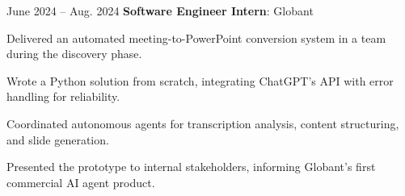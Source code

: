 \vspace{0.18cm}
\begin{twocolentry}{
    June 2024 – Aug. 2024
}
    \textbf{Software Engineer Intern}: Globant
\end{twocolentry}
\begin{highlights}
    \item Delivered an automated meeting-to-PowerPoint conversion system in a team during the discovery phase.
    \item Wrote a Python solution from scratch, integrating ChatGPT's API with error handling for reliability.
    \item Coordinated autonomous agents for transcription analysis, content structuring, and slide generation.
    \item Presented the prototype to internal stakeholders, informing Globant's first commercial AI agent product.
\end{highlights}